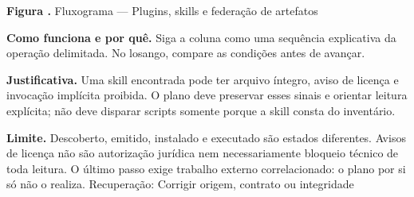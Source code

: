 {\small\textbf{Figura \thefigure.} Fluxograma --- Plugins, skills e federação de artefatos}\par\smallskip
\noindent\textbf{Como funciona e por quê.} Siga a coluna como uma sequência explicativa da operação delimitada. No losango, compare as condições antes de avançar.\par
\noindent\textbf{Justificativa.} Uma skill encontrada pode ter arquivo íntegro, aviso de licença e invocação implícita proibida. O plano deve preservar esses sinais e orientar leitura explícita; não deve disparar scripts somente porque a skill consta do inventário.\par
\noindent\textbf{Limite.} Descoberto, emitido, instalado e executado são estados diferentes. Avisos de licença não são autorização jurídica nem necessariamente bloqueio técnico de toda leitura. O último passo exige trabalho externo correlacionado: o plano por si só não o realiza. Recuperação: Corrigir origem, contrato ou integridade\par\smallskip
{}
